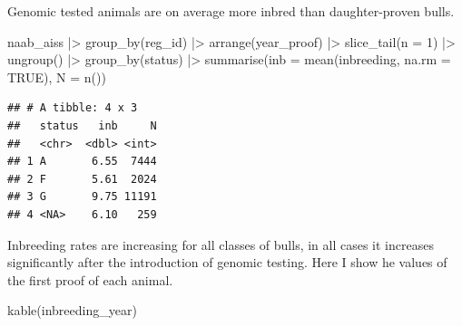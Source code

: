 \documentclass[
]{article}
\newenvironment{Shaded}{\begin{snugshade}}{\end{snugshade}}
\newcommand{\AttributeTok}[1]{\textcolor[rgb]{0.77,0.63,0.00}{#1}}
\newcommand{\ConstantTok}[1]{\textcolor[rgb]{0.00,0.00,0.00}{#1}}
\newcommand{\DecValTok}[1]{\textcolor[rgb]{0.00,0.00,0.81}{#1}}
\newcommand{\FunctionTok}[1]{\textcolor[rgb]{0.00,0.00,0.00}{#1}}
\newcommand{\NormalTok}[1]{#1}
\newcommand{\SpecialCharTok}[1]{\textcolor[rgb]{0.00,0.00,0.00}{#1}}
\begin{document}
Genomic tested animals are on average more inbred than daughter-proven
bulls.

\begin{Shaded}
\begin{Highlighting}[]
\NormalTok{naab\_aiss }\SpecialCharTok{|\textgreater{}}
  \FunctionTok{group\_by}\NormalTok{(reg\_id) }\SpecialCharTok{|\textgreater{}}
  \FunctionTok{arrange}\NormalTok{(year\_proof) }\SpecialCharTok{|\textgreater{}}
  \FunctionTok{slice\_tail}\NormalTok{(}\AttributeTok{n =} \DecValTok{1}\NormalTok{) }\SpecialCharTok{|\textgreater{}}
  \FunctionTok{ungroup}\NormalTok{() }\SpecialCharTok{|\textgreater{}} 
  \FunctionTok{group\_by}\NormalTok{(status) }\SpecialCharTok{|\textgreater{}} 
  \FunctionTok{summarise}\NormalTok{(}\AttributeTok{inb =} \FunctionTok{mean}\NormalTok{(inbreeding, }\AttributeTok{na.rm =} \ConstantTok{TRUE}\NormalTok{), }
            \AttributeTok{N =} \FunctionTok{n}\NormalTok{())}
\end{Highlighting}
\end{Shaded}

\begin{verbatim}
## # A tibble: 4 x 3
##   status   inb     N
##   <chr>  <dbl> <int>
## 1 A       6.55  7444
## 2 F       5.61  2024
## 3 G       9.75 11191
## 4 <NA>    6.10   259
\end{verbatim}

Inbreeding rates are increasing for all classes of bulls, in all cases
it increases significantly after the introduction of genomic testing.
Here I show he values of the first proof of each animal.

\begin{Shaded}
\begin{Highlighting}[]
\FunctionTok{kable}\NormalTok{(inbreeding\_year)}
\end{Highlighting}
\end{Shaded}
\end{document}
